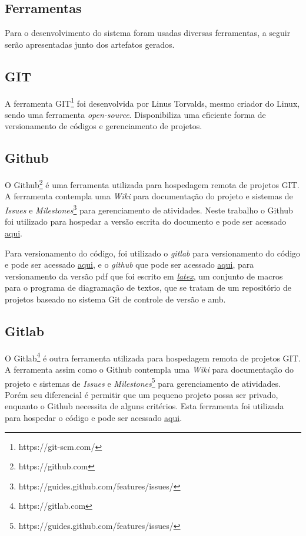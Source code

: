 \subsection{Ferramentas}\label{sub:solFerramentas}
  Para o desenvolvimento do sistema foram usadas diversas ferramentas, a seguir serão apresentadas junto
dos artefatos gerados.

\subsection{GIT}\label{sub:git}
  A ferramenta GIT\footnote{https://git-scm.com/} foi desenvolvida por Linus Torvalds, mesmo criador do Linux,
sendo uma ferramenta \textit{open-source}. Disponibiliza uma eficiente forma de versionamento de códigos e
gerenciamento de projetos.

\subsection{Github}\label{sub:github}
  O Github\footnote{https://github.com} é uma ferramenta utilizada para hospedagem remota de projetos GIT.
  A ferramenta contempla uma \textit{Wiki} para documentação do projeto e sistemas de \textit{Issues} e
  \textit{Milestones}\footnote{https://guides.github.com/features/issues/} para gerenciamento de atividades.
Neste trabalho o Github foi utilizado para hospedar a versão escrita do documento e pode ser acessado \href{https://github.com/ricardogtx/Tcc}{aqui}.

Para versionamento do código, foi utilizado o \textit{gitlab} para versionamento do código
e pode ser acessado \href{https://gitlab.com}{aqui}, e o \textit{github} que pode ser acessado \href{https://github.com/ricardogtx/Tcc}{aqui},
para versionamento da versão pdf que foi escrito em \href{https://www.latex-project.org/}{\textit{latex}}, um conjunto de macros para o programa
de diagramação de textos, que se tratam de um repositório de projetos baseado no sistema Git de controle de versão e amb.

\subsection{Gitlab}\label{sub:gitlab}
  O Gitlab\footnote{https://gitlab.com} é outra ferramenta utilizada para hospedagem remota de projetos GIT.
  A ferramenta assim como o Github contempla uma \textit{Wiki} para documentação do projeto e sistemas de \textit{Issues} e
  \textit{Milestones}\footnote{https://guides.github.com/features/issues/} para gerenciamento de atividades. Porém seu diferencial é permitir que um
pequeno projeto possa ser privado, enquanto o Github necessita de alguns critérios. Esta ferramenta foi utilizada para hospedar o código e pode ser acessado
\href{https://gitlab.com/ricardogtx/Tcc}{aqui}.


